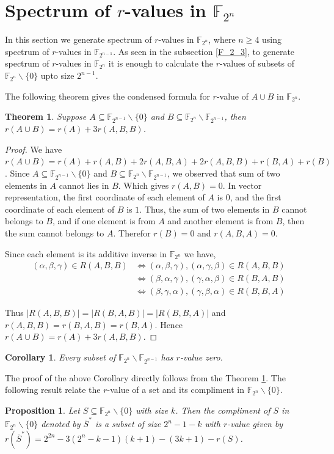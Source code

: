 \documentclass[12pt,a4paper]{article}
\newtheorem{prop}{Proposition}[section]
\newtheorem{thm}{Theorem}[section]
\newtheorem{cor}{Corollary}[section]
\begin{document}
	\section{Spectrum of $r$-values in $\mathbb{F}_{2^n}$}\label{Spec 2_n}
	In this section we generate spectrum of $r$-values in $\mathbb{F}_{2^n}$, where $n\geq 4$ using spectrum of $r$-values in $\mathbb{F}_{2^{n-1}}$. As seen in the subsection \ref{F_2_3}, to generate spectrum of $r$-values in $\mathbb{F}_{2^n}$ it is enough to calculate the $r$-values of subsets of $\mathbb{F}_{2^n}\backslash\{0\}$ upto size $2^{n-1}$.
	
	
	The following theorem gives the condensed formula for $r$-value of $A\cup B$ in $\mathbb{F}_{2^n}$.
	
	\begin{thm}\label{union}
		Suppose $A\subseteq\mathbb{F}_{2^{n-1}}\backslash\{0\}$ and $B\subseteq\mathbb{F}_{2^n}\backslash\mathbb{F}_{2^{n-1}}$, then $r(A\cup B)=r(A)+3r(A,B,B)$.
	\end{thm}
	\begin{proof}
		We have $r(A\cup B)=r(A)+r(A,B)+2r(A,B,A)+2r(A,B,B)+r(B,A)+r(B)$. Since $A\subseteq\mathbb{F}_{2^{n-1}}\backslash\{0\}$ and $B\subseteq\mathbb{F}_{2^n}\backslash\mathbb{F}_{2^{n-1}}$, we observed that sum of two elements in $A$ cannot lies in $B$. Which gives $r(A,B)=0$. In vector representation, the first coordinate of each element of $A$ is $0$, and the first coordinate of each element of $B$ is $1$. Thus, the sum of two elements in $B$ cannot belongs to $B$, and if one element is from $A$ and another element is from $B$, then the sum cannot belongs to $A$. Therefor $r(B)=0$ and $r(A,B,A)=0$.
		
		Since each element is its additive inverse in $\mathbb{F}_{2^n}$ we have,	
		\begin{align*}
			(\alpha,\beta,\gamma)\in R(A,B,B)&\Leftrightarrow(\alpha,\beta,\gamma),(\alpha,\gamma,\beta)\in R(A,B,B)\\
			&\Leftrightarrow(\beta,\alpha,\gamma),(\gamma,\alpha,\beta)\in R(B,A,B)\\
			&\Leftrightarrow(\beta,\gamma,\alpha),(\gamma,\beta,\alpha)\in R(B,B,A)
		\end{align*}
		
		Thus $|R(A,B,B)|=|R(B,A,B)|=|R(B,B,A)|$ and $r(A,B,B)=r(B,A,B)=r(B,A)$. Hence $r(A\cup B)=r(A)+3r(A,B,B)$.
	\end{proof}
	\begin{cor}\label{coro}
		Every subset of $\mathbb{F}_{2^n}\backslash\mathbb{F}_{2^{n-1}}$ has $r$-value zero.
	\end{cor}
	The proof of the above Corollary directly follows from the Theorem \ref{union}. The following result relate the $r$-value of a set and its compliment in $\mathbb{F}_{2^n}\backslash\{0\}$.
	\begin{prop}\label{compliment without zero}
		Let $S\subseteq\mathbb{F}_{2^n}\backslash\{0\}$ with size $k$. Then the compliment of $S$ in $\mathbb{F}_{2^n}\backslash\{0\}$ denoted by $\overline{S}^*$ is a subset of size $2^n-1-k$ with $r$-value  given by $r(\overline{S}^*)=2^{2n}-3(2^n-k-1)(k+1)-(3k+1)-r(S)$.
	\end{prop}
	
\end{document}
